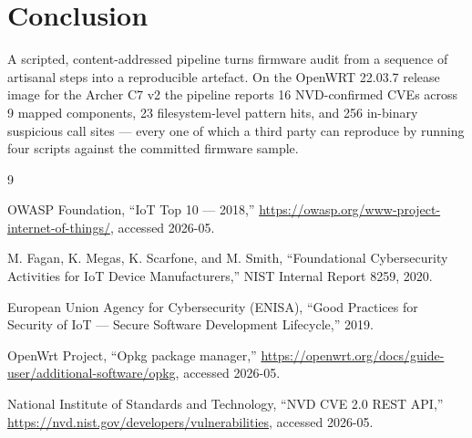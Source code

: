 \documentclass[conference]{IEEEtran}
\begin{document}
\section{Conclusion}

A scripted, content-addressed pipeline turns firmware audit from a
sequence of artisanal steps into a reproducible artefact. On the
OpenWRT 22.03.7 release image for the Archer C7 v2 the pipeline
reports 16 NVD-confirmed CVEs across 9 mapped components, 23
filesystem-level pattern hits, and 256 in-binary suspicious call
sites — every one of which a third party can reproduce by running
four scripts against the committed firmware sample.

\begin{thebibliography}{9}

OWASP Foundation, ``IoT Top 10 — 2018,''
\url{https://owasp.org/www-project-internet-of-things/}, accessed
2026-05.

M. Fagan, K. Megas, K. Scarfone, and M. Smith,
``Foundational Cybersecurity Activities for IoT Device
Manufacturers,'' NIST Internal Report 8259, 2020.

European Union Agency for Cybersecurity (ENISA),
``Good Practices for Security of IoT — Secure Software Development
Lifecycle,'' 2019.

OpenWrt Project, ``Opkg package manager,''
\url{https://openwrt.org/docs/guide-user/additional-software/opkg},
accessed 2026-05.

National Institute of Standards and Technology,
``NVD CVE 2.0 REST API,''
\url{https://nvd.nist.gov/developers/vulnerabilities}, accessed
2026-05.

\end{thebibliography}
\end{document}
